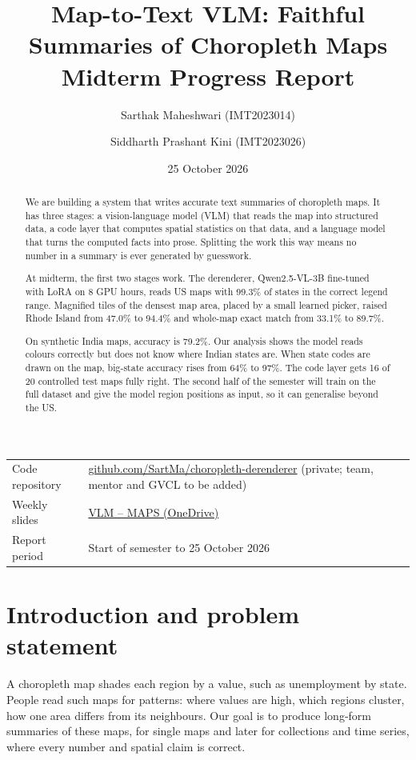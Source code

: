 \documentclass[11pt,a4paper]{article}
\title{Map-to-Text VLM: Faithful Summaries of Choropleth Maps\\[4pt]\large Midterm Progress Report}
\author{Sarthak Maheshwari (IMT2023014) \and Siddharth Prashant Kini (IMT2023026)}
\date{25 October 2026}
\begin{document}
\maketitle

\begin{center}
\begin{tabularx}{\textwidth}{@{}lL@{}}
\toprule
Code repository & \href{https://github.com/SartMa/choropleth-derenderer}{github.com/SartMa/choropleth-derenderer} (private; team, mentor and GVCL to be added)\\
Weekly slides & \href{https://iiitbac-my.sharepoint.com/:p:/r/personal/sarthak_maheshwari_iiitb_ac_in/_layouts/15/doc2.aspx?sourcedoc=\%7BDCE8C4F7-9DB7-445F-8A17-8A1432DB3F70\%7D}{VLM -- MAPS (OneDrive)}\\
Report period & Start of semester to 25 October 2026\\
\bottomrule
\end{tabularx}
\end{center}

\begin{abstract}
We are building a system that writes accurate text summaries of choropleth maps. It has three stages: a vision-language model (VLM) that reads the map into structured data, a code layer that computes spatial statistics on that data, and a language model that turns the computed facts into prose. Splitting the work this way means no number in a summary is ever generated by guesswork.

At midterm, the first two stages work. The derenderer, Qwen2.5-VL-3B fine-tuned with LoRA on 8 GPU hours, reads US maps with 99.3\% of states in the correct legend range. Magnified tiles of the densest map area, placed by a small learned picker, raised Rhode Island from 47.0\% to 94.4\% and whole-map exact match from 33.1\% to 89.7\%.

On synthetic India maps, accuracy is 79.2\%. Our analysis shows the model reads colours correctly but does not know where Indian states are. When state codes are drawn on the map, big-state accuracy rises from 64\% to 97\%. The code layer gets 16 of 20 controlled test maps fully right. The second half of the semester will train on the full dataset and give the model region positions as input, so it can generalise beyond the US.
\end{abstract}

\section{Introduction and problem statement}
A choropleth map shades each region by a value, such as unemployment by state. People read such maps for patterns: where values are high, which regions cluster, how one area differs from its neighbours. Our goal is to produce long-form summaries of these maps, for single maps and later for collections and time series, where every number and spatial claim is correct.
\end{document}

